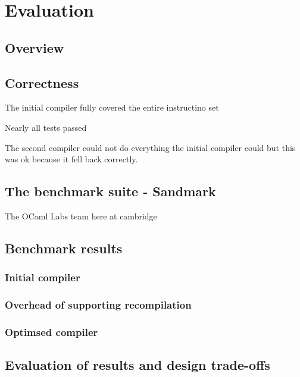 \chapter{Evaluation}

\section{Overview}

\section{Correctness}

The initial compiler fully covered the entire instructino set

Nearly all tests passed

The second compiler could not do everything the initial compiler could but this was ok because it
fell back correctly.

\section{The benchmark suite - Sandmark}

The OCaml Labs team here at cambridge

\section{Benchmark results}

\subsection{Initial compiler}

\subsection{Overhead of supporting recompilation}

\subsection{Optimsed compiler}

\section{Evaluation of results and design trade-offs}